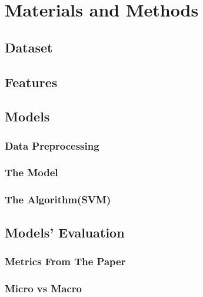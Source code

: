 \section{\Large Materials and Methods}
    \subsection{\large Dataset}
    

    \subsection{\large Features}
    
    
    \subsection{\large Models}
        \vspace{5mm}
        \subsubsection{\normalsize Data Preprocessing}
        
            
            
            

        \vspace{5mm}
        \subsubsection{\normalsize The Model}
        
            

            

        \vspace{5mm}
        \subsubsection{\normalsize The Algorithm(SVM)}
            
            
        
    \vspace{5mm}
    \subsection{\large Models' Evaluation}
    
        \subsubsection{\normalsize Metrics From The Paper}
            
        
        \subsubsection{\normalsize Micro vs Macro}
            
    
